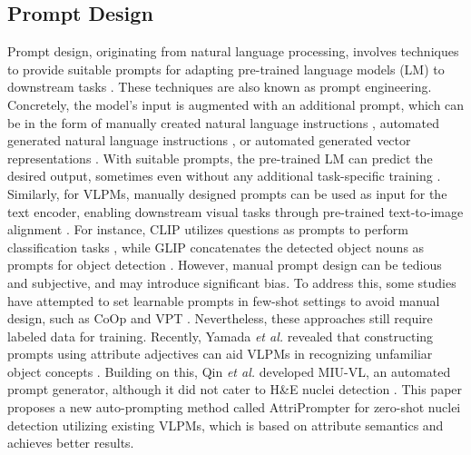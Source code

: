 \documentclass[journal,twoside,web]{ieeecolor}
\begin{document}
\subsection{Prompt Design}\; Prompt design, originating from natural language processing, involves techniques to provide suitable prompts for adapting pre-trained language models (LM) to downstream tasks \cite{liu2023pre}. These techniques are also known as prompt engineering. Concretely, the model's input is augmented with an additional prompt, which can be in the form of manually created natural language instructions \cite{wei2022chain}, automated generated natural language instructions \cite{zhang2022automatic}, or automated generated vector representations \cite{lester2021power}. With suitable prompts, the pre-trained LM can predict the desired output, sometimes even without any additional task-specific training \cite{brown2020language}. Similarly, for VLPMs, manually designed prompts can be used as input for the text encoder, enabling downstream visual tasks through pre-trained text-to-image alignment \cite{gu2023systematic}. For instance, CLIP utilizes questions as prompts to perform classification tasks \cite{radford2021learning}, while GLIP concatenates the detected object nouns as prompts for object detection \cite{li2022grounded}. However, manual prompt design can be tedious and subjective, and may introduce significant bias. To address this, some studies have attempted to set learnable prompts in few-shot settings to avoid manual design, such as CoOp \cite{zhou2022learning} and VPT \cite{jia2022visual}. Nevertheless, these approaches still require labeled data for training. Recently, Yamada \textit{et al.} revealed that constructing prompts using attribute adjectives can aid VLPMs in recognizing unfamiliar object concepts \cite{yamada2022lemons}. Building on this, Qin \textit{et al.} developed MIU-VL, an automated prompt generator, although it did not cater to H\&E nuclei detection \cite{qin2022medical}. This paper proposes a new auto-prompting method called AttriPrompter for zero-shot nuclei detection utilizing existing VLPMs, which is based on attribute semantics and achieves better results.
\end{document}
